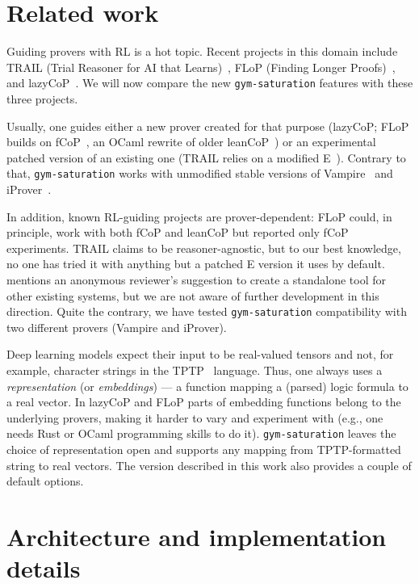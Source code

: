 \documentclass[runningheads]{llncs}
\begin{document}
\section{Related work}\label{section:related-work}
Guiding provers with RL is a hot topic. Recent projects in this domain include TRAIL (Trial Reasoner for AI that Learns)~\cite{9669114}, FLoP (Finding Longer Proofs)~\cite{FLoP}, and lazyCoP~\cite{10.1007/978-3-030-86059-2_11}. We will now compare the new \texttt{gym-saturation} features with these three projects.

Usually, one guides either a new prover created for that purpose (lazyCoP; FLoP builds on fCoP~\cite{fCoP}, an OCaml rewrite of older leanCoP~\cite{OTTEN2003139}) or an experimental patched version of an existing one (TRAIL relies on a modified E~\cite{10.1007/978-3-030-29436-6_29}). Contrary to that, \texttt{gym-saturation} works with unmodified stable versions of Vampire~\cite{10.1007/978-3-642-39799-8_1} and iProver~\cite{DBLP:conf/cade/DuarteK20}.

In addition, known RL-guiding projects are prover-dependent: FLoP could, in principle, work with both fCoP and leanCoP but reported only fCoP experiments. TRAIL claims to be reasoner-agnostic, but to our best knowledge, no one has tried it with anything but a patched E version it uses by default. ~\cite{10.1007/978-3-030-86059-2_11} mentions an anonymous reviewer's suggestion to create a standalone tool for other existing systems, but we are not aware of further development in this direction. Quite the contrary, we have tested \texttt{gym-saturation} compatibility with two different provers (Vampire and iProver).

Deep learning models expect their input to be real-valued tensors and not, for example, character strings in the TPTP~\cite{DBLP:journals/jar/Sutcliffe17} language. Thus, one always uses a \emph{representation} (or \emph{embeddings}) --- a function mapping a (parsed) logic formula to a real vector. In lazyCoP and FLoP parts of embedding functions belong to the underlying provers, making it harder to vary and experiment with (e.g., one needs Rust or OCaml programming skills to do it). \texttt{gym-saturation} leaves the choice of representation open and supports any mapping from TPTP-formatted string to real vectors. The version described in this work also provides a couple of default options.
\section{Architecture and implementation details}\label{section:implementation}
\end{document}
